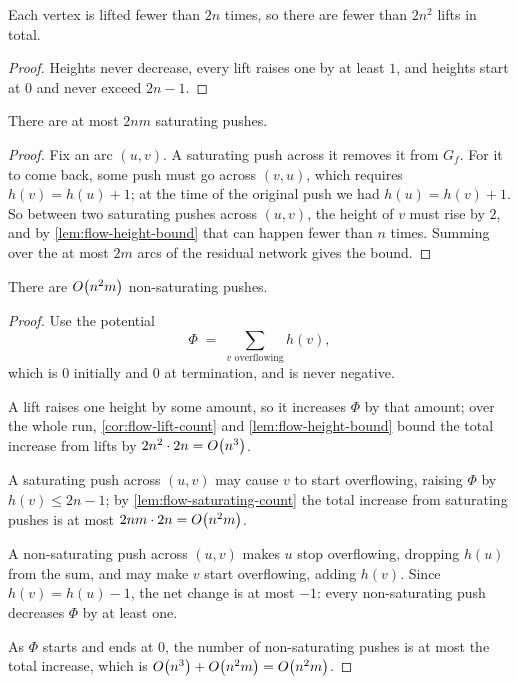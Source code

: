 \begin{corollary}\label{cor:flow-lift-count}
Each vertex is lifted fewer than $2n$ times, so there are fewer than $2n^2$
lifts in total.
\end{corollary}

\begin{proof}
Heights never decrease, every lift raises one by at least $1$, and heights start
at $0$ and never exceed $2n-1$.
\end{proof}

\begin{lemma}\label{lem:flow-saturating-count}
There are at most $2nm$ saturating pushes.
\end{lemma}

\begin{proof}
Fix an arc $(u,v)$. A saturating push across it removes it from $G_f$. For it to
come back, some push must go across $(v,u)$, which requires $h(v) = h(u)+1$; at
the time of the original push we had $h(u) = h(v)+1$. So between two saturating
pushes across $(u,v)$, the height of $v$ must rise by $2$, and by
\cref{lem:flow-height-bound} that can happen fewer than $n$ times. Summing over
the at most $2m$ arcs of the residual network gives the bound.
\end{proof}

\begin{lemma}\label{lem:flow-nonsaturating-count}
There are $O\!\left(n^2m\right)$ non-saturating pushes.
\end{lemma}

\begin{proof}
Use the potential
\[ \Phi \;=\; \sum_{v \text{ overflowing}} h(v), \]
which is $0$ initially and $0$ at termination, and is never negative.

A lift raises one height by some amount, so it increases $\Phi$ by that amount;
over the whole run, \cref{cor:flow-lift-count} and \cref{lem:flow-height-bound}
bound the total increase from lifts by $2n^2 \cdot 2n = O\!\left(n^3\right)$.

A saturating push across $(u,v)$ may cause $v$ to start overflowing, raising
$\Phi$ by $h(v) \le 2n-1$; by \cref{lem:flow-saturating-count} the total
increase from saturating pushes is at most $2nm \cdot 2n = O\!\left(n^2m\right)$.

A non-saturating push across $(u,v)$ makes $u$ stop overflowing, dropping
$h(u)$ from the sum, and may make $v$ start overflowing, adding $h(v)$. Since
$h(v) = h(u)-1$, the net change is at most $-1$: every non-saturating push
decreases $\Phi$ by at least one.

As $\Phi$ starts and ends at $0$, the number of non-saturating pushes is at most
the total increase, which is $O\!\left(n^3\right) + O\!\left(n^2m\right) = O\!\left(n^2m\right)$.
\end{proof}

